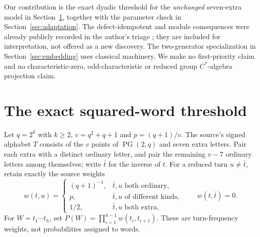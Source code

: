 \documentclass[11pt]{article}
\begin{document}
Our contribution is the exact dyadic threshold for the \emph{unchanged}
seven-extra model in Section~\ref{sec:threshold}, together with the
parameter check in Section~\ref{sec:adaptation}. The defect-idempotent
and module consequences were already publicly recorded in the author's
triage \cite{Triage}; they are included for interpretation, not offered
as a new discovery. The two-generator specialization in
Section~\ref{sec:embedding} uses classical machinery. We make no
first-priority claim and no characteristic-zero, odd-characteristic or
reduced group $C^*$-algebra projection claim.

\section{The exact squared-word threshold}\label{sec:threshold}
Let $q=2^k$ with $k\ge2$, $v=q^2+q+1$ and $p=(q+1)/v$.
The source's signed alphabet $T$ consists of the $v$ points of
$\operatorname{PG}(2,q)$ and seven extra letters. Pair each extra with a
distinct ordinary letter, and pair the remaining $v-7$ ordinary letters
among themselves; write $\bar t$ for the inverse of $t$. For a reduced
turn $u\ne\bar t$, retain exactly the source weights
\[
w(t,u)=\begin{cases}
(q+1)^{-1},&\bar t,u\text{ both ordinary},\\
p,&\bar t,u\text{ of different kinds},\\
1/2,&\bar t,u\text{ both extra},
\end{cases}\qquad w(t,\bar t)=0.
\]
For $W=t_1\cdots t_h$, set $P(W)=\prod_{i=1}^{h-1}w(t_i,t_{i+1})$.
These are turn-frequency weights, not probabilities assigned to words.
\end{document}

